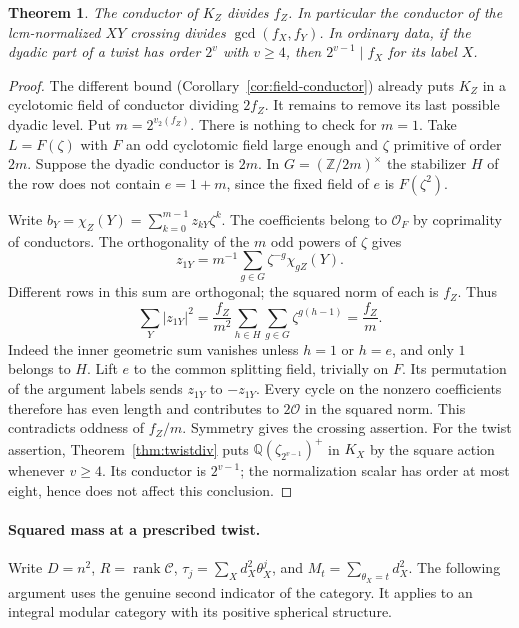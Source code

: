 \documentclass[11pt,a4paper]{article}
\numberwithin{equation}{section}
\newtheorem{theorem}{Theorem}[section]
\theoremstyle{remark}
\begin{document}
\begin{theorem}\label{por:th:exact-conductor}
The conductor of $K_Z$ divides $f_Z$. In particular the conductor of the lcm-normalized $XY$ crossing divides $\gcd(f_X,f_Y)$. In ordinary data, if the dyadic part of a twist has order $2^v$ with $v\ge4$, then $2^{v-1}\mid f_X$ for its label $X$.
\end{theorem}
\begin{proof}
The different bound (Corollary~\ref{cor:field-conductor}) already puts $K_Z$ in a cyclotomic field of conductor dividing $2f_Z$. It remains to remove its last possible dyadic level. Put $m=2^{v_2(f_Z)}$. There is nothing to check for $m=1$. Take $L=F(\zeta)$ with $F$ an odd cyclotomic field large enough and $\zeta$ primitive of order $2m$. Suppose the dyadic conductor is $2m$. In $G=(\mathbb Z/2m)^\times$ the stabilizer $H$ of the row does not contain $e=1+m$, since the fixed field of $e$ is $F(\zeta^2)$.

Write $b_Y=\chi_Z(Y)=\sum_{k=0}^{m-1}z_{kY}\zeta^k$. The coefficients belong to $\mathcal O_F$ by coprimality of conductors. The orthogonality of the $m$ odd powers of $\zeta$ gives
\[
 z_{1Y}=m^{-1}\sum_{g\in G}\zeta^{-g}\chi_{gZ}(Y).
\]
Different rows in this sum are orthogonal; the squared norm of each is $f_Z$. Thus
\[
 \sum_Y|z_{1Y}|^2=\frac{f_Z}{m^2}\sum_{h\in H}\sum_{g\in G}\zeta^{g(h-1)}
                 =\frac{f_Z}{m}.
\]
Indeed the inner geometric sum vanishes unless $h=1$ or $h=e$, and only $1$ belongs to $H$. Lift $e$ to the common splitting field, trivially on $F$. Its permutation of the argument labels sends $z_{1Y}$ to $-z_{1Y}$. Every cycle on the nonzero coefficients therefore has even length and contributes to $2\mathcal O$ in the squared norm. This contradicts oddness of $f_Z/m$. Symmetry gives the crossing assertion. For the twist assertion, Theorem~\ref{thm:twistdiv} puts $\mathbb Q(\zeta_{2^{v-1}})^+$ in $K_X$ by the square action whenever $v\ge4$. Its conductor is $2^{v-1}$; the normalization scalar has order at most eight, hence does not affect this conclusion.
\end{proof}
\paragraph{Squared mass at a prescribed twist.}
Write $D=n^2$, $R=\operatorname{rank}\mathcal C$, $\tau_j=\sum_X d_X^2\theta_X^j$, and $M_t=\sum_{\theta_X=t}d_X^2$. The following argument uses the genuine second indicator of the category. It applies to an integral modular category with its positive spherical structure.
\end{document}

